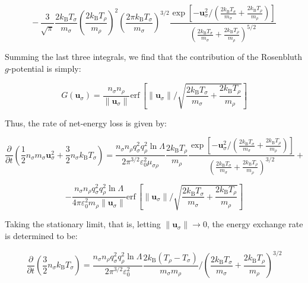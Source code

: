 \begin{equation}
    -\,\frac{3}{\sqrt{\pi}}\frac{2k_\mathrm{B}T_\sigma}{m_\sigma}\left(\frac{2k_\mathrm{B}T_\rho}{m_\rho}\right)^2\left(\frac{2\pi k_\mathrm{B}T_\sigma}{m_\sigma}\right)^{3/2}\frac{\exp{\left[-\mathbf{u}_\sigma^2\bigg/\left(\frac{2k_\mathrm{B}T_\sigma}{m_\sigma}+\frac{2k_\mathrm{B}T_\rho}{m_\rho}\right)\right]}}{\left(\frac{2k_\mathrm{B}T_\sigma}{m_\sigma}+\frac{2k_\mathrm{B}T_\rho}{m_\rho}\right)^{5/2}}
\end{equation}

Summing the last three integrals, we find that the contribution of the Rosenbluth $g$-potential is simply:

\begin{equation}
    G(\mathbf{u}_\sigma)=\frac{n_\sigma n_\rho}{\|\mathbf{u}_\sigma\|}\text{erf}\,\left[\|\mathbf{u}_\sigma\|\bigg/\sqrt{\frac{2k_\mathrm{B}T_\sigma}{m_\sigma}+\frac{2k_\mathrm{B}T_\rho}{m_\rho}}\right]
\end{equation}

Thus, the rate of net-energy loss is given by:

\begin{equation*}
    \frac{\partial}{\partial t}\left(\frac{1}{2}n_\sigma m_\sigma\mathbf{u}_\sigma^2+\frac{3}{2}n_\sigma k_\mathrm{B}T_\sigma\right)=\frac{n_\sigma n_\rho q_\sigma^2q_\rho^2\ln{\Lambda}}{2\pi^{3/2}\varepsilon_0^2\mu_{\sigma\rho}}\frac{2k_\mathrm{B}T_\rho}{m_\rho}\frac{\exp{\left[-\mathbf{u}_\sigma^2\bigg/\left(\frac{2k_\mathrm{B}T_\sigma}{m_\sigma}+\frac{2k_\mathrm{B}T_\rho}{m_\rho}\right)\right]}}{\left(\frac{2k_\mathrm{B}T_\sigma}{m_\sigma}+\frac{2k_\mathrm{B}T_\rho}{m_\rho}\right)^{3/2}}+
\end{equation*}

\begin{equation}
    \label{eq-fokker-138}
    -\frac{n_\sigma n_\rho q_\sigma^2q_\rho^2\ln{\Lambda}}{4\pi\varepsilon_0^2m_\rho\|\mathbf{u}_\sigma\|}\text{erf}\,\left[\|\mathbf{u}_\sigma\|\bigg/\sqrt{\frac{2k_\mathrm{B}T_\sigma}{m_\sigma}+\frac{2k_\mathrm{B}T_\rho}{m_\rho}}\right]
\end{equation}

Taking the stationary limit, that is, letting $\|\mathbf{u}_\sigma\|\to0$, the energy exchange rate is determined to be:

\begin{equation}
    \label{eq-fokker-139}
    \frac{\partial}{\partial t}\left(\frac{3}{2}n_\sigma k_\mathrm{B}T_\sigma\right)=\frac{n_\sigma n_\rho q_\sigma^2q_\rho^2\ln{\Lambda}}{2\pi^{3/2}\varepsilon_0^2}\frac{2k_\mathrm{B}(T_\rho-T_\sigma)}{m_\sigma m_\rho}\bigg/\left(\frac{2k_\mathrm{B}T_\sigma}{m_\sigma}+\frac{2k_\mathrm{B}T_\rho}{m_\rho}\right)^{3/2}
\end{equation}

